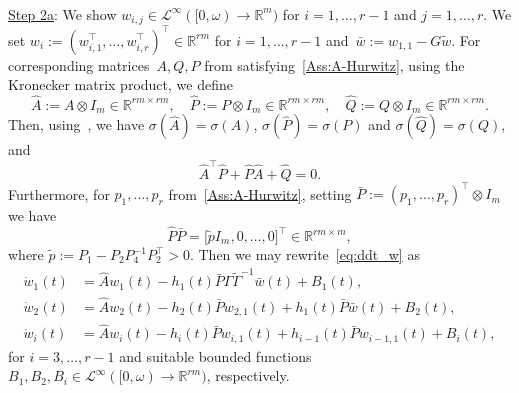 \documentclass[ envcountsect, envcountsame]{svjour3}
\newcommand{\R}{\mathbb{R}}
\newcommand{\cL}{\mathcal{L}}
\begin{document}
\ \\
\underline{Step 2a}: 
We show $w_{i,j} \in \cL^\infty([0,\omega) \to \R^m)$ for $i=1,\ldots,r-1$ and $j=1,\ldots,r$.
We set $w_i := (w_{i,1}^\top,\ldots,w_{i,r}^\top)^\top \in \R^{rm}$ for $i=1,\ldots,r-1$ and~$\bar w := w_{1,1} - G \tilde w$. 
For corresponding matrices~$A,Q,P$ from satisfying~\ref{Ass:A-Hurwitz}, using the Kronecker matrix product, we define
\begin{equation} \label{def:hatAPQ}
\hat A := A \otimes I_m \in \R^{rm \times rm}, \quad \hat P := P \otimes I_m \in \R^{rm \times rm}, \quad \hat Q := Q \otimes I_m \in \R^{rm \times rm}.
\end{equation}
Then, using~\cite[Fact 7.4.34]{Bern09}, we have $\sigma(\hat A) = \sigma(A)$, $\sigma(\hat P) = \sigma(P)$ and $\sigma(\hat Q) = \sigma(Q)$, and
\begin{equation} \label{eq:hatAhatP+hatPhatA}
\hat A^\top \hat P + \hat P \hat A + \hat Q = 0.
\end{equation}
Furthermore, for $p_1,\ldots,p_r$ from~\ref{Ass:A-Hurwitz}, setting $\bar P := (p_1,\ldots,p_{r})^\top \otimes I_m$ we have
\begin{equation}  \label{eq:hatPbarP}
\hat P \bar P = \big[ \tilde p I_m , 0 ,\ldots, 0 \big]^\top \in \R^{rm \times m},
\end{equation}
where $\tilde p := P_1 - P_2 P_4^{-1} P_2^\top > 0$.
Then we may rewrite~\eqref{eq:ddt_w} as
\begin{equation} \label{eq:ddt_w-overall}
\begin{aligned}
\dot w_1(t) &= \hat A w_1(t) - h_1(t) \bar P \Gamma \tilde \Gamma^{-1} \bar w(t) + B_1(t) , \\
\dot w_2(t) &= \hat A w_2(t) - h_2(t) \bar P w_{2,1}(t) + h_1(t) \bar P \bar w(t) + B_2(t)  , \\
\dot w_i(t) &= \hat A w_i(t) - h_i(t) \bar P w_{i,1}(t) + h_{i-1}(t) \bar P w_{i-1,1}(t) + B_i(t) , 
\end{aligned}
\end{equation}
for $i=3,\ldots,r-1$ and suitable bounded functions $B_1, B_2, B_i \in \cL^\infty([0,\omega) \to \R^{rm})$, respectively.
\end{document}
